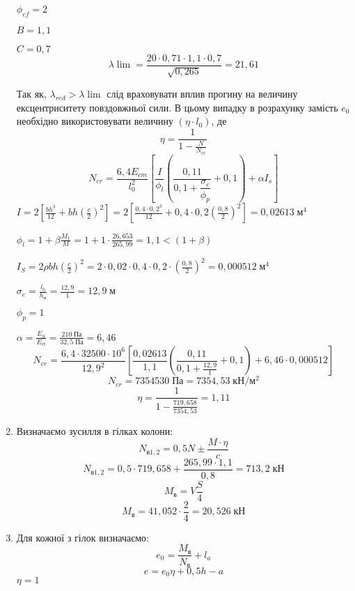\documentclass[a4paper,14pt]{article}
\begin{document}
\begin{enumerate}
            $\phi_{ef} = 2$

            $B = 1,1$

            $C = 0,7$
            $$\lambda\lim = \frac{20 \cdot 0,71 \cdot 1,1 \cdot 0,7}{\sqrt{0,265}} = 21,61$$

        Так як, $\lambda_{red} > \lambda\lim$ слід враховувати вплив прогину на величину ексцентриситету повздовжньої сили. В цьому випадку в розрахунку замість $e_0$ необхідно використовувати
        величину $(\eta \cdot l_0)$, де 
        \begin{equation}
            \eta = \frac{1}{1 - \frac{N}{N_{cr}}}
        \end{equation}
        \begin{equation}
            N_{cr} = \frac{6,4E_{cm}}{l_0^2}\left[\frac{I}{\phi_l}\left(\frac{0,11}{0,1 + \dfrac{\sigma_e}{\phi_p}} + 0,1\right) + \alpha I_s\right]
        \end{equation}
        $I = 2\left[\frac{bh^3}{12} + bh(\frac{c}{2})^2\right] = 2\left[\frac{0,4 \cdot 0,2^3}{12} + 0,4 \cdot 0,2 (\frac{0,8}{2})^2\right] = 0,02613\;\textit{м}^4$

        $\phi_l = 1 + \beta \frac{M_1}{M} = 1 + 1 \cdot \frac{26,653}{265,99} = 1,1 < (1 + \beta)$

        $I_S = 2 \rho bh(\frac{c}{2})^2 = 2 \cdot 0,02 \cdot 0,4 \cdot 0,2 \cdot (\frac{0,8}{2})^2 = 0,000512\;\textit{м}^4$

        $\sigma_e = \frac{l_0}{h_\textit{н}} = \frac{12,9}{1} = 12,9\;\textit{м}$

        $\phi_p = 1$

        $\alpha = \frac{E_S}{E_{ct}} = \frac{210\;\textit{Па}}{32,5\;\textit{Па}} = 6,46$
        $$N_{cr} = \frac{6,4 \cdot 32500 \cdot 10^6}{12,9^2}[\frac{0,02613}{1,1}(\frac{0,11}{0,1 + \frac{12,9}{1}} + 0,1) + 6,46 \cdot 0,000512]$$
        $$N_{cr} = 7354530\;\textit{Па} = 7354,53\;\textit{кН}/\textit{м}^2$$
        $$\eta = \frac{1}{1 - \frac{719,658}{7354,53}} = 1,11$$
    \item Визначаємо зусилля в гілках колони:
        \begin{equation}
            N_{\textit{в}1,2} = 0,5N \pm \frac{M \cdot \eta}{c}
        \end{equation}
        $$N_{\textit{в}1,2} = 0,5\cdot 719,658 + \frac{265,99 \cdot 1,1}{0,8} = 713,2\;\textit{кН}$$
        \begin{equation}
            M_\textit{в} = V \frac{S}{4}
        \end{equation}
        $$M_\textit{в} = 41,052 \cdot \frac{2}{4} = 20,526\;\textit{кН}$$
    \item Для кожної з гілок визначаємо:
        \begin{equation}
            e_0 = \frac{M_\textit{в}}{N_\textit{в}} + l_a
        \end{equation}
        \begin{equation}
            e = e_0\eta +  0,5h - a
        \end{equation}
        $\eta = 1$


\end{enumerate}
\end{document}
